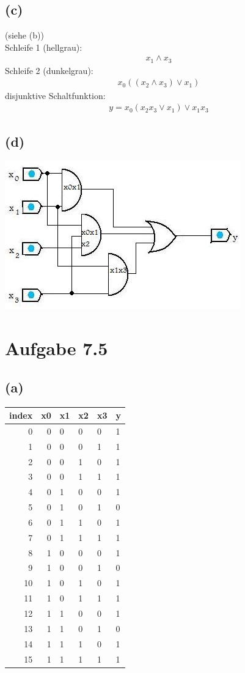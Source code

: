 \documentclass[12pt]{article}
\begin{document}
\subsection{(c)}
(siehe (b))\\
Schleife 1 (hellgrau):
\begin{align}
x_1 \land x_3
\end{align}
Schleife 2 (dunkelgrau):
\begin{align}
x_0((x_2 \land x_3) \lor x_1)
\end{align}
disjunktive Schaltfunktion:
\begin{align}
y = x_0 (x_2 x_3 \lor x_1) \lor x_1 x_3
\end{align}

\subsection{(d)}
\includegraphics{Schaltplan}

\section{Aufgabe 7.5}

\subsection{(a)}
\begin{tabular} {r|rlll|l}
index & x0 & x1 & x2 & x3 & y \\ \hline 
    0 &  0 &  0 &  0 &  0 & 1 \\
    1 &  0 &  0 &  0 &  1 & 1 \\
    2 &  0 &  0 &  1 &  0 & 1 \\
    3 &  0 &  0 &  1 &  1 & 1 \\
    4 &  0 &  1 &  0 &  0 & 1 \\
    5 &  0 &  1 &  0 &  1 & 0 \\
    6 &  0 &  1 &  1 &  0 & 1 \\
    7 &  0 &  1 &  1 &  1 & 1 \\
    8 &  1 &  0 &  0 &  0 & 1 \\
    9 &  1 &  0 &  0 &  1 & 0 \\
   10 &  1 &  0 &  1 &  0 & 1 \\
   11 &  1 &  0 &  1 &  1 & 1 \\
   12 &  1 &  1 &  0 &  0 & 1 \\
   13 &  1 &  1 &  0 &  1 & 0 \\
   14 &  1 &  1 &  1 &  0 & 1 \\
   15 &  1 &  1 &  1 &  1 & 1
\end{tabular}
\end{document}

